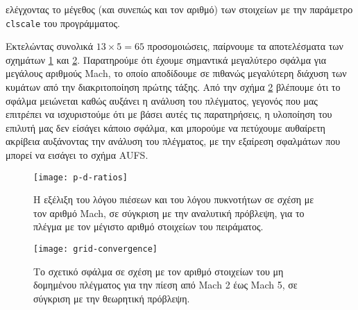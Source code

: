 ελέγχοντας το μέγεθος (και συνεπώς και τον αριθμό) των στοιχείων με την παράμετρο \texttt{clscale} του προγράμματος.

Εκτελώντας συνολικά $13 \times 5 = 65$ προσομοιώσεις, παίρνουμε τα αποτελέσματα των σχημάτων \ref{fig:p-d-ratios} και \ref{fig:grid-conv}.
Παρατηρούμε ότι έχουμε σημαντικά μεγαλύτερο σφάλμα για μεγάλους αριθμούς Mach, το οποίο αποδίδουμε σε πιθανώς μεγαλύτερη διάχυση των κυμάτων από την διακριτοποίηση πρώτης τάξης.
Από την σχήμα \ref{fig:grid-conv} βλέπουμε ότι το σφάλμα μειώνεται καθώς αυξάνει η ανάλυση του πλέγματος, γεγονός που μας επιτρέπει να ισχυριστούμε ότι με βάσει αυτές τις παρατηρήσεις, η υλοποίηση του επιλυτή μας δεν είσάγει κάποιο σφάλμα, και μπορούμε να πετύχουμε αυθαίρετη ακρίβεια αυξάνοντας την ανάλυση του πλέγματος, με την εξαίρεση σφαλμάτων που μπορεί να εισάγει το σχήμα AUFS.

\begin{figure}
    \centering
    \texttt{[image: p-d-ratios]}
    \caption{Η εξέλιξη του λόγου πιέσεων και του λόγου πυκνοτήτων σε σχέση με τον αριθμό Mach, σε σύγκριση με την αναλυτική πρόβλεψη, για το πλέγμα με τον μέγιστο αριθμό στοιχείων του πειράματος.}
    \label{fig:p-d-ratios}
\end{figure}

\begin{figure}
    \centering
    \texttt{[image: grid-convergence]}
    \caption{Το σχετικό σφάλμα σε σχέση με τον αριθμό στοιχείων του μη δομημένου πλέγματος για την πίεση από Mach 2 έως Mach 5, σε σύγκριση με την θεωρητική πρόβλεψη.}
    \label{fig:grid-conv}
\end{figure}


% 
% 
% 
% 


